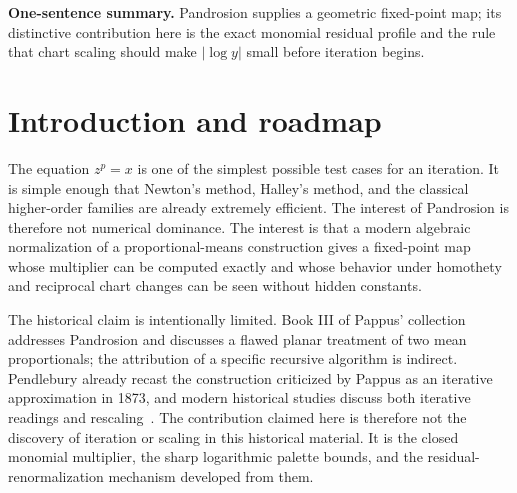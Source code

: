 \documentclass[10pt,a4paper]{article}
\theoremstyle{plain}
\theoremstyle{definition}
\theoremstyle{remark}
\newenvironment{takeaway}{%
  \begin{center}\begin{minipage}{0.92\linewidth}\small\itshape\color{blue!45!black}%
}{%
  \end{minipage}\end{center}%
}
\begin{document}
\begin{abstract}
Finally, the same logarithmic principle leads to an intrinsic acceleration mechanism called Iterated Renormalized Pandrosion (IRP).  Instead of applying an external Aitken--Steffensen or Halley correction, IRP repeatedly recomputes the residual chart, snaps it to a small logarithmic scale cell, applies one raw Pandrosion layer, and returns to the root coordinate.  In the local cell containing the exact residual, one renormalized raw layer is quadratic in the logarithmic root error, and iterating the layer gives exact dyadic order amplification: $k$ renormalized layers have local order $2^k$.  The result is a deliberately narrow but coherent real-positive account of the Pandrosion monomial scheme: fixed point, global convergence, contraction, scaling, reciprocal charts, and iterated renormalization.
\end{abstract}

\begin{takeaway}
\textbf{One-sentence summary.}
Pandrosion supplies a geometric fixed-point map; its distinctive contribution here is the exact monomial residual profile and the rule that chart scaling should make $|\log y|$ small before iteration begins.
\end{takeaway}

\clearpage
\renewcommand{\contentsname}{Contents}
\tableofcontents
\clearpage


\section{Introduction and roadmap}
\label{sec:intro}

The equation $z^p=x$ is one of the simplest possible test cases for an
iteration.  It is simple enough that Newton's method, Halley's method, and the
classical higher-order families are already extremely efficient.  The interest
of Pandrosion is therefore not numerical dominance.  The interest is that a
modern algebraic normalization of a proportional-means construction gives a fixed-point map whose
multiplier can be computed exactly and whose behavior under homothety and
reciprocal chart changes can be seen without hidden constants.

The historical claim is intentionally limited.  Book III of Pappus' collection
addresses Pandrosion and discusses a flawed planar treatment of two mean
proportionals; the attribution of a specific recursive algorithm is indirect.
Pendlebury already recast the construction criticized by Pappus as an iterative
approximation in 1873, and modern historical studies discuss both iterative
readings and rescaling~\cite{pendlebury1873,knorr1989,cuomo2000,steihaug2019}.
The contribution claimed here is therefore not the discovery of iteration or
scaling in this historical material.  It is the closed monomial multiplier,
the sharp logarithmic palette bounds, and the residual-renormalization mechanism
developed from them.
\end{document}

